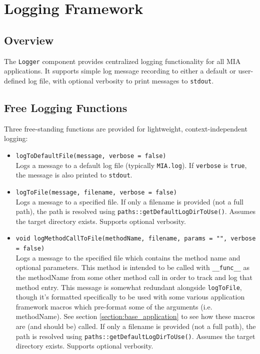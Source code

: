 \section{Logging Framework}
\label{section:logging_Framework}

\subsection{Overview}
The \texttt{Logger} component provides centralized logging functionality for all MIA applications. It supports simple log message recording to either a default or user-defined log file, with optional verbosity to print messages to \texttt{stdout}.

\subsection{Free Logging Functions}
Three free-standing functions are provided for lightweight, context-independent logging:

\begin{itemize}\itemsep0em
	\item \texttt{logToDefaultFile(message, verbose = false)}\\
	Logs a message to a default log file (typically \texttt{MIA.log}). If \texttt{verbose} is \texttt{true}, the message is also printed to \texttt{stdout}.
	
	\item \texttt{logToFile(message, filename, verbose = false)}\\
	Logs a message to a specified file. If only a filename is provided (not a full path), the path is resolved using \texttt{paths::getDefaultLogDirToUse()}. Assumes the target directory exists. Supports optional verbosity.

 	\item \texttt{void logMethodCallToFile(methodName, filename, params = "", verbose = false)}\\
  	Logs a message to the specified file which contains the method name and optional parameters. This method is intended to be called with \texttt{\_\_func\_\_} as the methodName from some other method call in order to track and log that method entry. This message is somewhat redundant alongside \texttt{logToFile}, though it's formatted specifically to be used with some various application framework macros which pre-format some of the arguments (i.e. methodName). See section \ref{section:base_application} to see how these macros are (and should be) called. If only a filename is provided (not a full path), the path is resolved using \texttt{paths::getDefaultLogDirToUse()}. Assumes the target directory exists. Supports optional verbosity.
\end{itemize}

